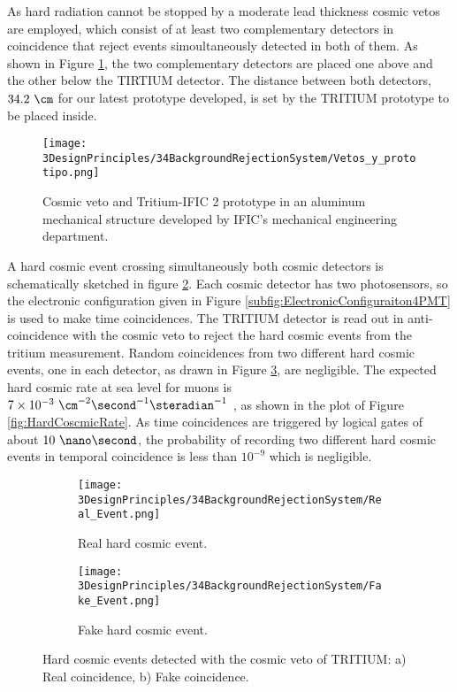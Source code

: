 As hard radiation cannot be stopped by a moderate lead thickness cosmic vetos are employed, which consist of at least two complementary detectors in coincidence that reject events simoultaneously detected in both of them. As shown in Figure \ref{fig:VetoAndPrototype}, the two complementary detectors are placed one above and the other below the TIRTIUM detector. The distance between both detectors, $34.2~\cm$ for our latest prototype developed, is set by the TRITIUM prototype to be placed inside.

\begin{figure}[h]
\centering
\texttt{[image: 3DesignPrinciples/34BackgroundRejectionSystem/Vetos\_y\_prototipo.png]}
\caption{Cosmic veto and Tritium-IFIC 2 prototype in an aluminum mechanical structure developed by IFIC's mechanical engineering department.\label{fig:VetoAndPrototype}}
\end{figure}

A hard cosmic event crossing simultaneously both cosmic detectors is schematically sketched in figure \ref{subfig:RealHardCosmicEvent}. Each cosmic detector has two photosensors, so the electronic configuration given in Figure \ref{subfig:ElectronicConfiguraiton4PMT} is used to make time coincidences. The TRITIUM detector is read out in anti-coincidence with the cosmic veto to reject the hard cosmic events from the tritium measurement. Random coincidences from two different hard cosmic events, one in each detector, as drawn in Figure \ref{subfig:FakeHardCosmicEvent}, are negligible. The expected hard cosmic rate at sea level for muons is $7\times 10^{-3}~\cm^{-2}\second^{-1}\steradian^{-1}$ \cite{PDG, HardCosmicMuonRate}, as shown in the plot of Figure \ref{fig:HardCoscmicRate}. As time coincidences are triggered by logical gates of about $10~\nano\second$, the probability of recording two different hard cosmic events in temporal coincidence is less than $10^{-9}$ which is negligible.

\begin{figure}[h]
\centering
    \begin{subfigure}[b]{0.45\textwidth}
    \centering
    \texttt{[image: 3DesignPrinciples/34BackgroundRejectionSystem/Real\_Event.png]}  
    \caption{Real hard cosmic event.\label{subfig:RealHardCosmicEvent}}
    \end{subfigure}
    \hfill
    \begin{subfigure}[b]{0.45\textwidth}
    \centering
    \texttt{[image: 3DesignPrinciples/34BackgroundRejectionSystem/Fake\_Event.png]}  
    \caption{Fake hard cosmic event.\label{subfig:FakeHardCosmicEvent}}
    \end{subfigure}
   \caption{Hard cosmic events detected with the cosmic veto of TRITIUM: a) Real coincidence, b) Fake coincidence.}
 \label{fig:HardCosmicEventsSimulation}
\end{figure}

